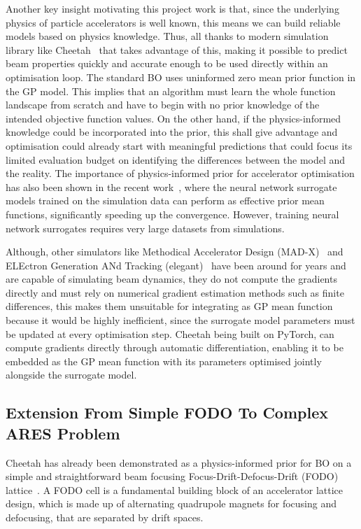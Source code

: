 Another key insight motivating this project work is that, since the underlying physics of particle accelerators is well known,
this means we can build reliable models based on physics knowledge. Thus, all thanks to modern simulation library like Cheetah~\cite{kaiser2024bridging} that takes advantage of this,
making it possible to predict beam properties quickly and accurate enough to be used directly within an optimisation loop. The standard BO uses uninformed zero 
mean prior function in the GP model. This implies that an algorithm must learn the whole function landscape from scratch and have to begin with no prior knowledge of the intended objective 
function values. On the other hand, if the physics-informed knowledge could be incorporated into the prior, this shall give advantage 
and optimisation could already start with meaningful predictions that could focus its limited evaluation budget on identifying the 
differences between the model and the reality. The importance of physics-informed prior for accelerator optimisation has also been 
shown in the recent work~\cite{boltz2025priormeanmodule}, where the neural network surrogate models trained on the simulation data can perform as effective prior 
mean functions, significantly speeding up the convergence. However, training neural network surrogates requires very large datasets 
from simulations. \

Although, other simulators like Methodical Accelerator Design (MAD-X)~\cite{madx2023} and ELEctron Generation ANd Tracking (elegant)~\cite{elegant2000} have been around for years and are capable of simulating beam dynamics, they do not compute the gradients directly and must rely on numerical gradient estimation methods such as finite differences, this makes them unsuitable for 
integrating as GP mean function because it would be highly inefficient, since the surrogate model parameters must be updated at every optimisation step. Cheetah being built on PyTorch, can compute gradients
directly through automatic differentiation, enabling it to be embedded as the GP mean function with its parameters optimised jointly alongside the
surrogate model.


\subsection{Extension From Simple FODO To Complex ARES Problem}

Cheetah has already been demonstrated as a physics-informed prior for BO on a simple and straightforward beam focusing Focus-Drift-Defocus-Drift 
(FODO) lattice~\cite{kaiser2024bridging}. A FODO cell is a fundamental building block of an accelerator lattice design, which is made up of alternating quadrupole magnets 
for focusing and defocusing, that are separated by drift spaces. \

